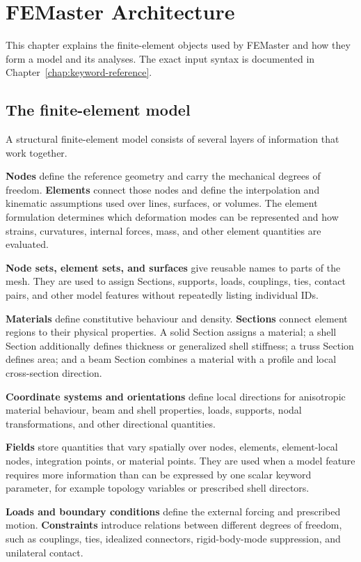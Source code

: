 \chapter{FEMaster Architecture}
\label{chap:architecture}

This chapter explains the finite-element objects used by FEMaster and how they form a model and its analyses. The exact input syntax is documented in Chapter~\ref{chap:keyword-reference}.

\section{The finite-element model}

A structural finite-element model consists of several layers of information that work together.

\textbf{Nodes} define the reference geometry and carry the mechanical degrees of freedom. \textbf{Elements} connect those nodes and define the interpolation and kinematic assumptions used over lines, surfaces, or volumes. The element formulation determines which deformation modes can be represented and how strains, curvatures, internal forces, mass, and other element quantities are evaluated.

\textbf{Node sets, element sets, and surfaces} give reusable names to parts of the mesh. They are used to assign Sections, supports, loads, couplings, ties, contact pairs, and other model features without repeatedly listing individual IDs.

\textbf{Materials} define constitutive behaviour and density. \textbf{Sections} connect element regions to their physical properties. A solid Section assigns a material; a shell Section additionally defines thickness or generalized shell stiffness; a truss Section defines area; and a beam Section combines a material with a profile and local cross-section direction.

\textbf{Coordinate systems and orientations} define local directions for anisotropic material behaviour, beam and shell properties, loads, supports, nodal transformations, and other directional quantities.

\textbf{Fields} store quantities that vary spatially over nodes, elements, element-local nodes, integration points, or material points. They are used when a model feature requires more information than can be expressed by one scalar keyword parameter, for example topology variables or prescribed shell directors.

\textbf{Loads and boundary conditions} define the external forcing and prescribed motion. \textbf{Constraints} introduce relations between different degrees of freedom, such as couplings, ties, idealized connectors, rigid-body-mode suppression, and unilateral contact.

